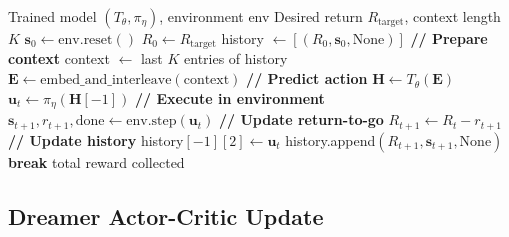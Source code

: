 \begin{algorithm}[H]
\caption{Decision Transformer Inference}
\begin{algorithmic}[1]
\Require Trained model $(T_\theta, \pi_\eta)$, environment env
\Require Desired return $R_{\text{target}}$, context length $K$
\State $\mathbf{s}_0 \gets \text{env.reset}()$
\State $R_0 \gets R_{\text{target}}$ 
\State history $\gets [(R_0, \mathbf{s}_0, \text{None})]$
    \State \textbf{// Prepare context}
    \State context $\gets$ last $K$ entries of history
    \State $\mathbf{E} \gets \text{embed\_and\_interleave}(\text{context})$
    \State \textbf{// Predict action}
    \State $\mathbf{H} \gets T_\theta(\mathbf{E})$
    \State $\mathbf{u}_t \gets \pi_\eta(\mathbf{H}[-1])$ 
    \State \textbf{// Execute in environment}
    \State $\mathbf{s}_{t+1}, r_{t+1}, \text{done} \gets \text{env.step}(\mathbf{u}_t)$
    \State \textbf{// Update return-to-go}
    \State $R_{t+1} \gets R_t - r_{t+1}$
    \State \textbf{// Update history}
    \State history$[-1][2] \gets \mathbf{u}_t$ 
    \State history.append$(R_{t+1}, \mathbf{s}_{t+1}, \text{None})$
        \State \textbf{break}
    \EndIf
\EndFor
\State \Return total reward collected
\end{algorithmic}
\end{algorithm}

\subsection{Dreamer Actor-Critic Update}

